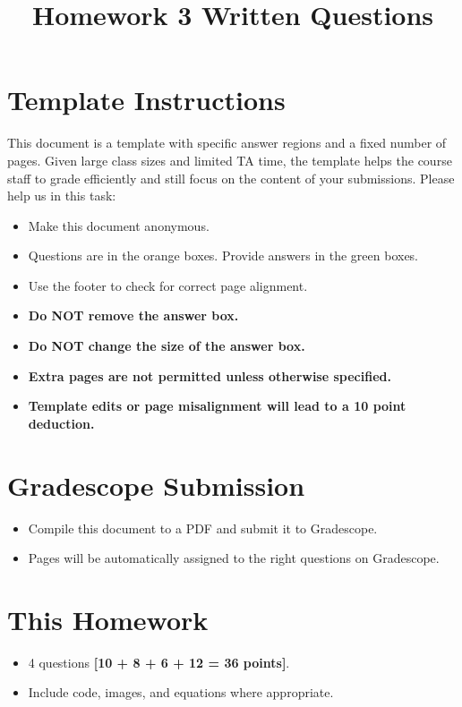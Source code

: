 \date{}

\title{\vspace{-1cm}Homework 3 Written Questions}



\maketitle
\thispagestyle{fancy}

\section*{Template Instructions}

This document is a template with specific answer regions and a fixed number of pages. Given large class sizes and limited TA time, the template helps the course staff to grade efficiently and still focus on the content of your submissions. Please help us in this task:
 
\begin{itemize}
  \item Make this document anonymous.
  
  \item Questions are in the orange boxes. Provide answers in the green boxes.
  \item Use the footer to check for correct page alignment.

  \item \textbf{Do NOT remove the answer box.}
  \item \textbf{Do NOT change the size of the answer box.}
  \item \textbf{Extra pages are not permitted unless otherwise specified.}
  \item \textbf{Template edits or page misalignment will lead to a 10 point deduction.}
\end{itemize}

\section*{Gradescope Submission}
\begin{itemize}
  \item Compile this document to a PDF and submit it to Gradescope.
  \item Pages will be automatically assigned to the right questions on Gradescope.
\end{itemize}

\section*{This Homework}
\begin{itemize}
    \item 4 questions \textbf{[10 + 8 + 6 + 12 = 36 points]}.
    \item Include code, images, and equations where appropriate.
\end{itemize}

